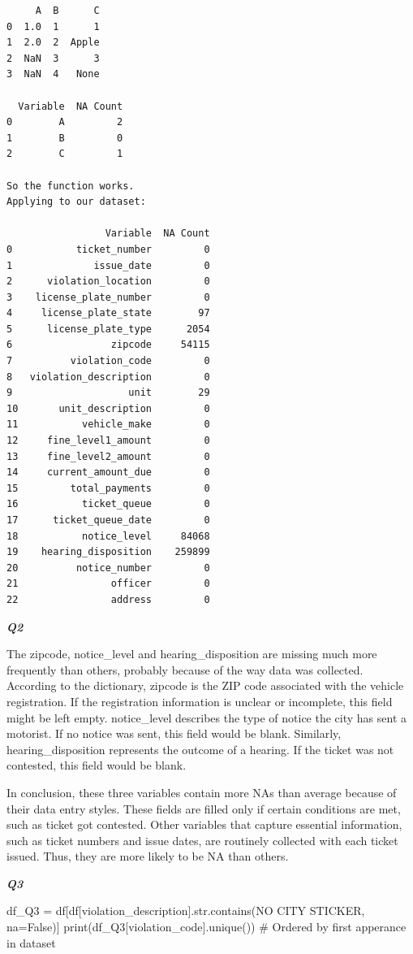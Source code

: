 \documentclass[
  letterpaper,
  DIV=11,
  numbers=noendperiod]{scrartcl}
\newenvironment{Shaded}{\begin{snugshade}}{\end{snugshade}}
\newcommand{\BuiltInTok}[1]{\textcolor[rgb]{0.00,0.23,0.31}{#1}}
\newcommand{\CommentTok}[1]{\textcolor[rgb]{0.37,0.37,0.37}{#1}}
\newcommand{\NormalTok}[1]{\textcolor[rgb]{0.00,0.23,0.31}{#1}}
\newcommand{\OperatorTok}[1]{\textcolor[rgb]{0.37,0.37,0.37}{#1}}
\newcommand{\StringTok}[1]{\textcolor[rgb]{0.13,0.47,0.30}{#1}}
\newcommand{\VariableTok}[1]{\textcolor[rgb]{0.07,0.07,0.07}{#1}}
\begin{document}
\begin{verbatim}
     A  B      C
0  1.0  1      1
1  2.0  2  Apple
2  NaN  3      3
3  NaN  4   None 

  Variable  NA Count
0        A         2
1        B         0
2        C         1 

So the function works.
Applying to our dataset: 

                 Variable  NA Count
0           ticket_number         0
1              issue_date         0
2      violation_location         0
3    license_plate_number         0
4     license_plate_state        97
5      license_plate_type      2054
6                 zipcode     54115
7          violation_code         0
8   violation_description         0
9                    unit        29
10       unit_description         0
11           vehicle_make         0
12     fine_level1_amount         0
13     fine_level2_amount         0
14     current_amount_due         0
15         total_payments         0
16           ticket_queue         0
17      ticket_queue_date         0
18           notice_level     84068
19    hearing_disposition    259899
20          notice_number         0
21                officer         0
22                address         0
\end{verbatim}

\textbf{\emph{Q2}}

The zipcode, notice\_level and hearing\_disposition are missing much
more frequently than others, probably because of the way data was
collected. According to the dictionary, zipcode is the ZIP code
associated with the vehicle registration. If the registration
information is unclear or incomplete, this field might be left empty.
notice\_level describes the type of notice the city has sent a motorist.
If no notice was sent, this field would be blank. Similarly,
hearing\_disposition represents the outcome of a hearing. If the ticket
was not contested, this field would be blank.

In conclusion, these three variables contain more NAs than average
because of their data entry styles. These fields are filled only if
certain conditions are met, such as ticket got contested. Other
variables that capture essential information, such as ticket numbers and
issue dates, are routinely collected with each ticket issued. Thus, they
are more likely to be NA than others.

\textbf{\emph{Q3}}

\begin{Shaded}
\begin{Highlighting}[]
\NormalTok{df\_Q3 }\OperatorTok{=}\NormalTok{ df[df[}\StringTok{\textquotesingle{}violation\_description\textquotesingle{}}\NormalTok{].}\BuiltInTok{str}\NormalTok{.contains(}\StringTok{\textquotesingle{}NO CITY STICKER\textquotesingle{}}\NormalTok{, na}\OperatorTok{=}\VariableTok{False}\NormalTok{)]}
\BuiltInTok{print}\NormalTok{(df\_Q3[}\StringTok{\textquotesingle{}violation\_code\textquotesingle{}}\NormalTok{].unique()) }\CommentTok{\# Ordered by first apperance in dataset}
\end{Highlighting}
\end{Shaded}
\end{document}
